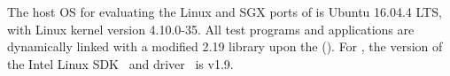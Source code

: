 The host OS for evaluating the Linux and SGX ports of \graphene{} is Ubuntu 16.04.4 LTS, with Linux kernel version 4.10.0-35.
All test programs and applications are dynamically linked
with a modified \glibc{} 2.19 library upon the 
\graphene{} \libos{} (\thelibos{}).
For \graphenesgx{},
the version of
the Intel \sgx{} Linux SDK~\cite{intel-sgx-linux-sdk} and driver~\cite{intel-sgx-linux-driver} is v1.9.